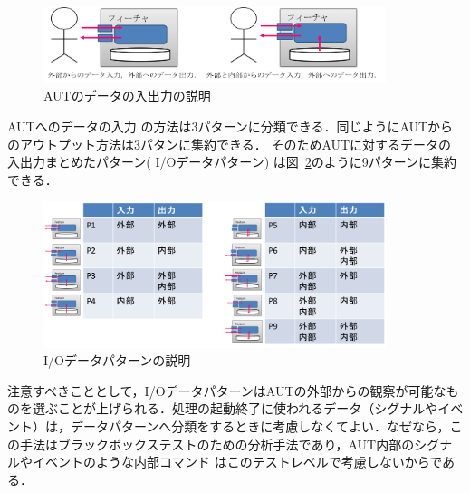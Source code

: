 \documentclass[a4paper,12pt]{jreport}
\begin{document}
 \begin{figure}[h]
  \begin{center}
  \includegraphics[width=10cm]{./image/D-3-Fig4.png}
  \caption{AUTのデータの入出力の説明}
  \label{fig:D-3-Fig4}
  \end{center}
   \end{figure}


AUTへのデータの入力 の方法は3パターンに分類できる．同じようにAUTからのアウトプット方法は3パタンに集約できる．  そのためAUTに対するデータの入出力まとめたパターン( I/Oデータパターン) は図~\ref{fig:D-3-Fig5}のように9パターンに集約できる．

    \begin{figure}[h]
  \begin{center}
  \includegraphics[width=10cm]{./image/D-3-Fig5.png}
  \caption{I/Oデータパターンの説明}
  \label{fig:D-3-Fig5}
  \end{center}
   \end{figure}

注意すべきこととして，I/OデータパターンはAUTの外部からの観察が可能なものを選ぶことが上げられる．処理の起動終了に使われるデータ（シグナルやイベント）は，データパターンへ分類をするときに考慮しなくてよい．なぜなら，この手法はブラックボックステストのための分析手法であり，AUT内部のシグナルやイベントのような内部コマンド はこのテストレベルで考慮しないからである．
\end{document}
